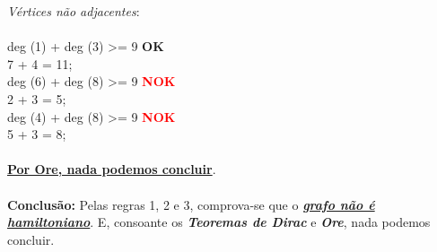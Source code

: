 \documentclass{report}
\begin{document}
\textit{Vértices não adjacentes}:\\\\
deg (1) + deg (3) >= 9 \textbf{OK} \\
7 + 4 = 11;\\
deg (6) + deg (8) >= 9 \textcolor{red}{\textbf{NOK}} \\
2 + 3 = 5;\\
deg (4) + deg (8) >= 9 \textcolor{red}{\textbf{NOK}} \\
5 + 3 = 8;\\\\
\underline{\textbf{Por Ore, nada podemos concluir}}.\\\\
\textbf{Conclusão:} Pelas regras 1, 2 e 3, comprova-se que o \underline{\textit{\textbf{grafo não é hamiltoniano}}}. E, consoante os \textit{\textbf{Teoremas de Dirac}} e \textit{\textbf{Ore}}, nada podemos concluir.
\end{document}
